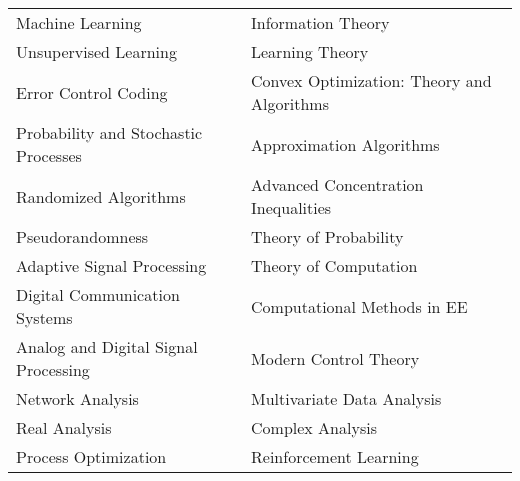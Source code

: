 \documentclass[margin, 11pt]{res} %
\begin{document}
\begin{resume}
\setlength\tabcolsep{15pt}
\begin{tabular}{ll}
	Machine Learning & Information Theory \\
	Unsupervised Learning & Learning Theory \\ 
	Error Control Coding & Convex Optimization: Theory and Algorithms\\
	Probability and Stochastic Processes & Approximation Algorithms \\ 
	Randomized Algorithms &  Advanced Concentration Inequalities\\
	Pseudorandomness & Theory of Probability \\
	Adaptive Signal Processing & Theory of Computation \\
	Digital Communication Systems & Computational Methods in EE \\ 
	Analog and Digital Signal Processing & Modern Control Theory\\
	Network Analysis & Multivariate Data Analysis\\
	Real Analysis & Complex Analysis\\
	Process Optimization & Reinforcement Learning\\
\end{tabular}




\end{resume}
\end{document}
